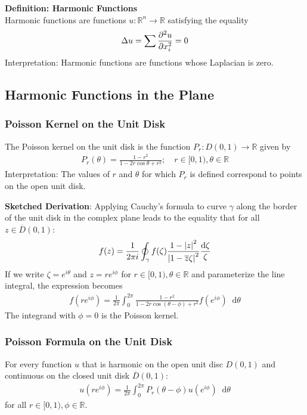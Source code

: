 \documentclass[11pt, a4paper]{article}
\newcommand{\diff}{\mathop{}\!\mathrm{d}} %
\newcommand{\R}{\mathbb{R}} %
\begin{document}
\textbf{Definition: Harmonic Functions}\\
Harmonic functions are functions $ u: \R^n \to \R $ satisfying the equality
\begin{align*}
	\Delta u = \sum \pdv[2]{u}{x_i} = 0
\end{align*}
Interpretation: Harmonic functions are functions whose Laplacian is zero.

\subsection{Harmonic Functions in the Plane}

\subsubsection{Poisson Kernel on the Unit Disk}
The Poisson kernel on the unit disk is the function $ P_r : D(0, 1) \to \R $ given by
\begin{align*}
	P_r(\theta) = \frac{1 - r^2}{1 - 2r\cos \theta + r^2}; \quad r\in[0, 1), \theta \in \R
\end{align*}
Interpretation: The values of $ r $ and $ \theta $ for which $ P_r $ is defined correspond to points on the open unit disk.

\textbf{Sketched Derivation}: Applying Cauchy's formula to curve $ \gamma $ along the border of the unit disk in the complex plane leads to the equality that for all $ z \in \overline{D}(0,1) $:
\begin{align*}
	f(z) = \frac{1}{2\pi i} \oint_{\gamma} f(\zeta) \frac{1 - \abs{z}^2}{\abs{1-\overline{z}\zeta}^2} \frac{\diff \zeta}{\zeta}
\end{align*}
If we write $ \zeta = e^{i\theta} $ and $ z = r e^{i\phi} $ for $ r\in[0, 1), \theta \in \R $ and parameterize the line integral, the expression becomes
\begin{align*}
	f(re^{i\phi}) = \frac{1}{2\pi} \int_{0}^{2\pi} \frac{1 - r^2}{1 - 2r \cos(\theta - \phi) + r^2} f(e^{i\phi}) \diff \theta
\end{align*}
The integrand with $ \phi = 0 $ is the Poisson kernel.

\subsubsection{Poisson Formula on the Unit Disk}
For every function $ u $ that is harmonic on the open unit disc $ D(0, 1) $ and continuous on the closed unit disk $ \overline{D}(0, 1) $:
\begin{align*}
	u(re^{i\phi}) = \frac{1}{2\pi} \int_{0}^{2\pi} P_r(\theta - \phi) u\left(e^{i\phi} \right)\diff \theta
\end{align*} 
for all $ r\in[0, 1), \phi \in \R $.
\end{document}
